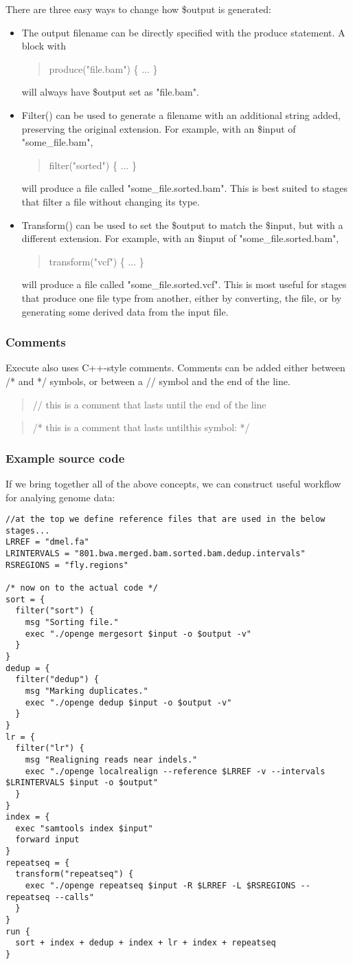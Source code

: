 \documentclass[11pt]{article}
\newcommand {\cmd}[1] {\begin{quote}#1\end{quote}}
\begin{document}
There are three easy ways to change how \$output is generated:
\begin{itemize}
\item The output filename can be directly specified with the produce statement. A block with
\cmd{produce("file.bam") \{ ... \} }
will always have \$output set as "file.bam".
\item Filter() can be used to generate a filename with an additional string added, preserving the original extension. For example, with an \$input of "some\_file.bam",
\cmd{filter("sorted") \{ ... \} }
will produce a file called "some\_file.sorted.bam". This is best suited to stages that filter a file without changing its type.
\item Transform() can be used to set the \$output to match the \$input, but with a different extension. For example, with an \$input of "some\_file.sorted.bam",
\cmd{transform("vcf") \{ ... \} }
will produce a file called "some\_file.sorted.vcf". This is most useful for stages that produce one file type from another, either by converting, the file, or by generating some derived data from the input file.
\end{itemize}
\subsubsection{Comments}
Execute also uses C++-style comments. Comments can be added either between /* and */ symbols, or between a // symbol and the end of the line.
\cmd{// this is a comment that lasts until the end of the line}
\cmd{/* this is a comment that lasts until\newline this symbol: */}

\subsubsection{Example source code}
If we bring together all of the above concepts, we can construct useful workflow for analying genome data:
\begin{verbatim}
//at the top we define reference files that are used in the below stages...
LRREF = "dmel.fa"
LRINTERVALS = "801.bwa.merged.bam.sorted.bam.dedup.intervals"
RSREGIONS = "fly.regions"

/* now on to the actual code */
sort = {
  filter("sort") {
    msg "Sorting file."
    exec "./openge mergesort $input -o $output -v"
  }
}
dedup = {
  filter("dedup") {
    msg "Marking duplicates."
    exec "./openge dedup $input -o $output -v"
  }
}
lr = {
  filter("lr") {
    msg "Realigning reads near indels."
    exec "./openge localrealign --reference $LRREF -v --intervals $LRINTERVALS $input -o $output"
  }
}
index = {
  exec "samtools index $input"
  forward input
}
repeatseq = {
  transform("repeatseq") {
    exec "./openge repeatseq $input -R $LRREF -L $RSREGIONS --repeatseq --calls"
  }
}
run {
  sort + index + dedup + index + lr + index + repeatseq
}
\end{verbatim}
\end{document}
